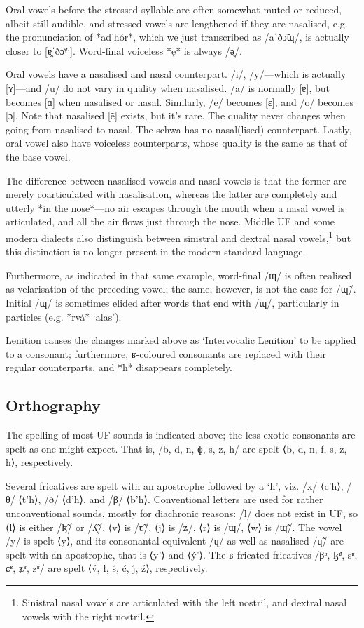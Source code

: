 \documentclass[a4paper, 12pt, oneside, final]{article}
\begin{document}
Oral vowels before the stressed syllable are often somewhat muted or reduced, albeit still audible, and stressed vowels are lengthened if they
are nasalised, e.g. the pronunciation of *ad’hór*, which we just transcribed as /aˈðɔ̃ɰ/, is actually closer to [ɐ̯ˈðɔ̃ˠˑ].
Word-final voiceless *ẹ* is always /ə̥/.

Oral vowels have a nasalised and nasal counterpart. /i/, /y/—which is actually [ʏ]—and /u/ do not vary in quality when nasalised.
/a/ is normally [ɐ],
but becomes [ɑ] when nasalised or nasal. Similarly, /e/ becomes [ɛ], and /o/ becomes [ɔ]. Note that nasalised [ẽ] exists, but it’s
rare. The quality never changes when going from nasalised to nasal. The schwa has no nasal(lised) counterpart. Lastly, oral vowel
also have voiceless counterparts, whose quality is the same as that of the base vowel.

The difference between nasalised vowels and nasal vowels is that the former are merely coarticulated with nasalisation, whereas
the latter are completely and utterly *in the nose*—no air escapes through the mouth when a nasal vowel is articulated, and all
the air flows just through the nose. Middle UF and some modern dialects also distinguish between sinistral and dextral nasal
vowels,\footnote{Sinistral nasal vowels are articulated with the left nostril, and dextral nasal vowels with the right nostril.}
but this distinction is no longer present in the modern standard language.

Furthermore, as indicated in that same example, word-final /ɰ/ is often realised as velarisation of the preceding vowel;
the same, however, is not the case for /ɰ̃/. Initial /ɰ/ is sometimes elided after words that end with /ɰ/, particularly
in particles (e.g. *rvá* ‘alas’).

Lenition causes the changes marked above as ‘Intervocalic Lenition’ to be applied to a consonant; furthermore,
ʁ-coloured consonants are replaced with their regular counterparts, and *h* disappears completely.

\subsection{Orthography}
The spelling of most UF sounds is indicated above; the less exotic consonants are spelt as
one might expect. That is, /b, d, n, ɸ, s, z, h/ are spelt ⟨b, d, n, f, s, z, h⟩, respectively.

Several fricatives are spelt with an apostrophe followed by a ‘h’, viz. /x/ ⟨c’h⟩, /θ/ ⟨t’h⟩, /ð/ ⟨d’h⟩,
and /β/ ⟨b’h⟩. Conventional letters are used for rather unconventional sounds, mostly for diachronic reasons:
/l/ does not exist in UF, so ⟨l⟩ is either /ɮ̃/ or /ʎ̝̃/, ⟨v⟩ is /ʋ̃/, ⟨j⟩ is /ʑ/, ⟨r⟩ is /ɰ/, ⟨w⟩ is /ɰ̃/. The vowel
/y/ is spelt ⟨y⟩, and its consonantal equivalent /ɥ/ as well as nasalised /ɥ̃/ are spelt with an apostrophe, that is
⟨y’⟩ and ⟨ý’⟩. The ʁ-fricated fricatives /βʶ, ɮ̃ʶ, sʶ, ɕʶ, ʑʶ, zʶ/
are spelt ⟨v́, ł, ś, ć, ȷ́, ź⟩, respectively.
\end{document}
